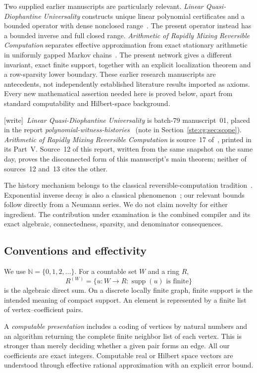 \documentclass[11pt,letterpaper]{article}
\theoremstyle{definition}
\theoremstyle{remark}
\newcommand{\N}{\mathbb N}
\DeclareMathOperator{\supp}{supp}
\newcommand{\wtag}{\textup{[write]}}
\begin{document}
Two supplied earlier manuscripts are particularly relevant. \emph{Linear
Quasi-Diophantine Universality} constructs unique linear polynomial
certificates and a bounded operator with dense nonclosed
range~\cite{linearreport}. The present operator instead has a bounded inverse
and full closed range. \emph{Arithmetic of Rapidly Mixing Reversible
Computation} separates effective approximation from exact stationary
arithmetic in uniformly gapped Markov chains~\cite{priorMixing}. The present
network gives a different invariant, exact finite support, together with
an explicit localization theorem and a row-sparsity lower boundary.
These earlier research manuscripts are antecedents, not independently
established literature results imported as axioms. Every new mathematical
assertion needed here is proved below, apart from standard computability and
Hilbert-space background.

\wtag\ \emph{Linear Quasi-Diophantine Universality} is batch-79 manuscript~01, placed in the report \emph{polynomial-witness-histories}~\cite{pwh} (note in Section~\ref{ste:cg:sec:scope}). \emph{Arithmetic of Rapidly Mixing Reversible Computation} is source~17 of~\cite{pqc}, printed in its Part~V. Source~12 of this report, written from the same snapshot on the same day, proves the disconnected form of this manuscript's main theorem; neither of sources~12 and~13 cites the other.

The history mechanism belongs to the classical reversible-computation
tradition~\cite{bennett}. Exponential inverse decay is also a classical
phenomenon~\cite{Demko}; our relevant bounds follow directly from a Neumann
series. We do not claim novelty for either ingredient. The contribution
under examination is the combined compiler and its exact algebraic,
connectedness, sparsity, and denominator consequences.

\subsection{Conventions and effectivity}
We use $\N=\{0,1,2,\ldots\}$. For a countable set $W$ and a ring $R$,
\[
 R^{(W)}=\{u:W\to R:\supp(u)\text{ is finite}\}
\]
is the algebraic direct sum. On a discrete locally finite graph, finite
support is the intended meaning of compact support. An element is represented
by a finite list of vertex--coefficient pairs.

A \emph{computable presentation} includes a coding of vertices by natural
numbers and an algorithm returning the complete finite neighbor list of each
vertex. This is stronger than merely deciding whether a given pair forms an
edge. All our coefficients are exact integers. Computable real or Hilbert
space vectors are understood through effective rational approximation with
an explicit error bound.
\end{document}
